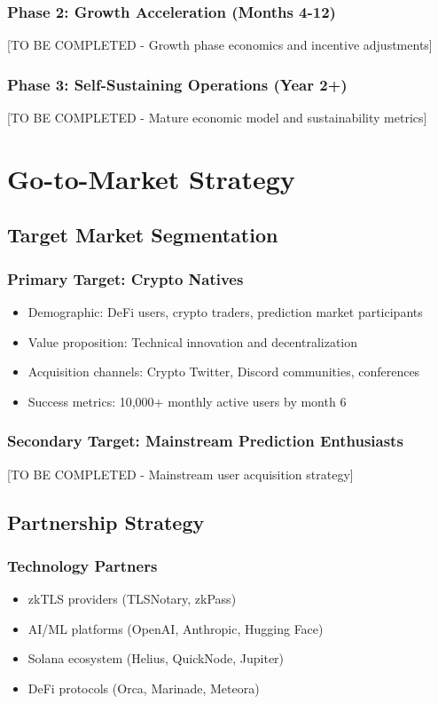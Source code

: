 \documentclass[11pt,a4paper]{article}
\begin{document}
\subsubsection{Phase 2: Growth Acceleration (Months 4-12)}
[TO BE COMPLETED - Growth phase economics and incentive adjustments]

\subsubsection{Phase 3: Self-Sustaining Operations (Year 2+)}
[TO BE COMPLETED - Mature economic model and sustainability metrics]

\section{Go-to-Market Strategy}

\subsection{Target Market Segmentation}

\subsubsection{Primary Target: Crypto Natives}
\begin{itemize}
    \item Demographic: DeFi users, crypto traders, prediction market participants
    \item Value proposition: Technical innovation and decentralization
    \item Acquisition channels: Crypto Twitter, Discord communities, conferences
    \item Success metrics: 10,000+ monthly active users by month 6
\end{itemize}

\subsubsection{Secondary Target: Mainstream Prediction Enthusiasts}
[TO BE COMPLETED - Mainstream user acquisition strategy]

\subsection{Partnership Strategy}

\subsubsection{Technology Partners}
\begin{itemize}
    \item zkTLS providers (TLSNotary, zkPass)
    \item AI/ML platforms (OpenAI, Anthropic, Hugging Face)
    \item Solana ecosystem (Helius, QuickNode, Jupiter)
    \item DeFi protocols (Orca, Marinade, Meteora)
\end{itemize}
\end{document}
